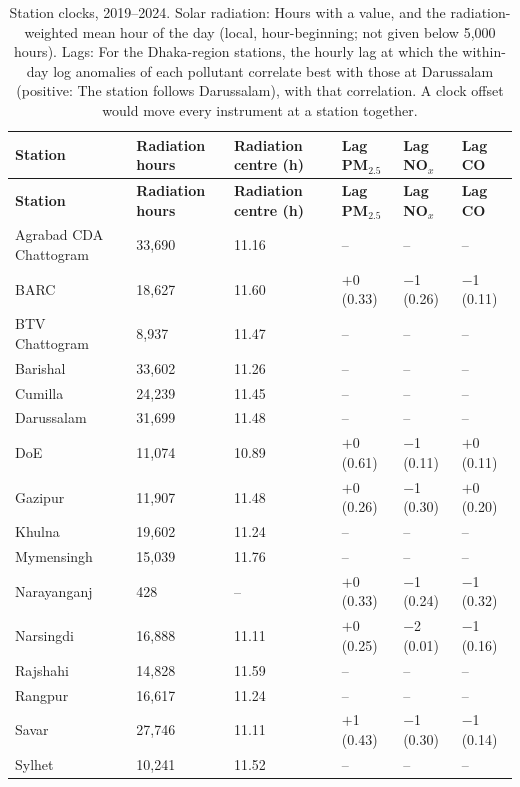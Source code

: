 \begingroup\footnotesize
\begin{longtable}{L{3.6cm} C{1.6cm} C{1.8cm} C{2.0cm} C{2.0cm} C{2.0cm}}
\caption{Station clocks, 2019--2024. Solar radiation: Hours with a value, and the radiation-weighted mean hour of the day (local, hour-beginning; not given below 5,000 hours). Lags: For the Dhaka-region stations, the hourly lag at which the within-day log anomalies of each pollutant correlate best with those at Darussalam (positive: The station follows Darussalam), with that correlation. A clock offset would move every instrument at a station together.}\label{tab:s-clock}\\
\toprule
\textbf{Station} & \textbf{Radiation hours} & \textbf{Radiation centre (h)} & \textbf{Lag PM$_{2.5}$} & \textbf{Lag NO$_x$} & \textbf{Lag CO} \\
\midrule\endfirsthead
\toprule
\textbf{Station} & \textbf{Radiation hours} & \textbf{Radiation centre (h)} & \textbf{Lag PM$_{2.5}$} & \textbf{Lag NO$_x$} & \textbf{Lag CO} \\
\midrule\endhead
\bottomrule\endfoot
Agrabad CDA Chattogram & 33,690 & 11.16 & -- & -- & -- \\
BARC & 18,627 & 11.60 & $+$0 {\scriptsize(0.33)} & $-$1 {\scriptsize(0.26)} & $-$1 {\scriptsize(0.11)} \\
BTV Chattogram & 8,937 & 11.47 & -- & -- & -- \\
Barishal & 33,602 & 11.26 & -- & -- & -- \\
Cumilla & 24,239 & 11.45 & -- & -- & -- \\
Darussalam & 31,699 & 11.48 & -- & -- & -- \\
DoE & 11,074 & 10.89 & $+$0 {\scriptsize(0.61)} & $-$1 {\scriptsize(0.11)} & $+$0 {\scriptsize(0.11)} \\
Gazipur & 11,907 & 11.48 & $+$0 {\scriptsize(0.26)} & $-$1 {\scriptsize(0.30)} & $+$0 {\scriptsize(0.20)} \\
Khulna & 19,602 & 11.24 & -- & -- & -- \\
Mymensingh & 15,039 & 11.76 & -- & -- & -- \\
Narayanganj & 428 & -- & $+$0 {\scriptsize(0.33)} & $-$1 {\scriptsize(0.24)} & $-$1 {\scriptsize(0.32)} \\
Narsingdi & 16,888 & 11.11 & $+$0 {\scriptsize(0.25)} & $-$2 {\scriptsize(0.01)} & $-$1 {\scriptsize(0.16)} \\
Rajshahi & 14,828 & 11.59 & -- & -- & -- \\
Rangpur & 16,617 & 11.24 & -- & -- & -- \\
Savar & 27,746 & 11.11 & $+$1 {\scriptsize(0.43)} & $-$1 {\scriptsize(0.30)} & $-$1 {\scriptsize(0.14)} \\
Sylhet & 10,241 & 11.52 & -- & -- & -- \\
\end{longtable}
\endgroup
